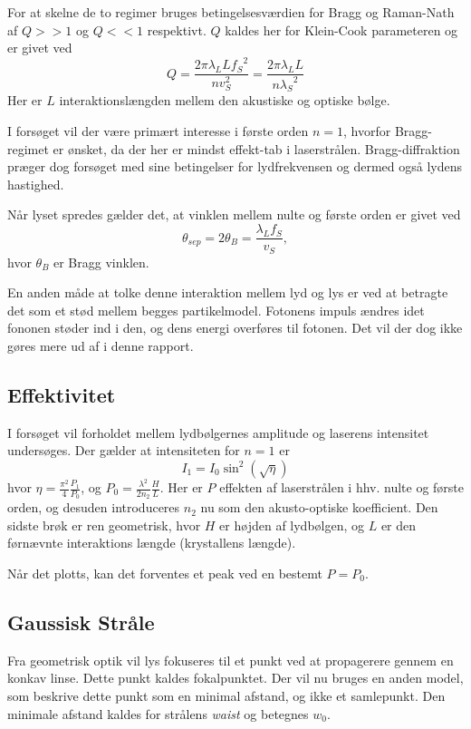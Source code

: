 \documentclass[main]{subfiles}
\begin{document}
For at skelne de to regimer bruges betingelsesværdien for Bragg og Raman-Nath af $Q>>1$ og $Q<<1$ respektivt. $Q$ kaldes her for Klein-Cook parameteren og er givet ved
\begin{equation}
    Q = \frac{2\pi\lambda_L L {f_{S}}^2}{n{v}_{S}^2}=\frac{2\pi\lambda_L L}{n{\lambda_S}^2}
\label{eq:KleinCook}
\end{equation}
Her er $L$ interaktionslængden mellem den akustiske og optiske bølge.

I forsøget vil der være primært interesse i første orden $n=1$, hvorfor Bragg-regimet er ønsket, da der her er mindst effekt-tab i laserstrålen. Bragg-diffraktion præger dog forsøget med sine betingelser for lydfrekvensen og dermed også lydens hastighed.

Når lyset spredes gælder det, at vinklen mellem nulte og første orden er givet ved
\begin{equation}
    \theta_{sep} = 2 \theta_B = \frac{\lambda_L f_S}{v_S},
    \label{eq:sep}
\end{equation}
hvor $\theta_B$ er Bragg vinklen.

En anden måde at tolke denne interaktion mellem lyd og lys er ved at betragte det som et stød mellem begges partikelmodel. Fotonens impuls ændres idet fononen støder ind i den, og dens energi overføres til fotonen. Det vil der dog ikke gøres mere ud af i denne rapport.

\subsection{Effektivitet}
I forsøget vil forholdet mellem lydbølgernes amplitude og laserens intensitet undersøges. Der gælder at intensiteten for $n=1$ er
\begin{equation}
    I_1 = I_0 \sin^2\left(\sqrt{\eta}\right)
    \label{eq:Intensitet}
\end{equation}
hvor $\eta = \frac{\pi^2}{4}\frac{P_1}{P_0}$, og $P_0 = \frac{\lambda^2}{2 n_2}\frac{H}{L}$. Her er $P$ effekten af laserstrålen i hhv. nulte og første orden, og desuden introduceres $n_2$ nu som den akusto-optiske koefficient. Den sidste brøk er ren geometrisk, hvor $H$ er højden af lydbølgen, og $L$ er den førnævnte interaktions længde (krystallens længde).

Når det plotts, kan det forventes et peak ved en bestemt $P=P_0$.

\subsection{Gaussisk Stråle}
Fra geometrisk optik vil lys fokuseres til et punkt ved at propagerere gennem en konkav linse. Dette punkt kaldes fokalpunktet.
Der vil nu bruges en anden model, som beskrive dette punkt som en minimal afstand, og ikke et samlepunkt. Den minimale afstand kaldes for strålens \emph{waist} og betegnes $w_0$.
\end{document}
